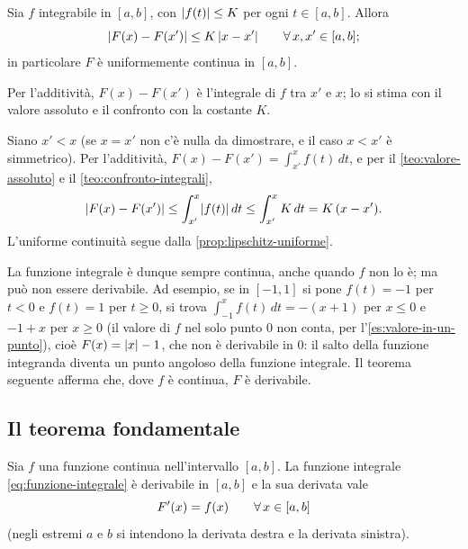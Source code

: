\begin{proposizione}\label{prop:integrale-lipschitz}
Sia $f$ integrabile in $[a,b]$, con $\lvert f(t)\rvert\le K$ per ogni $t\in[a,b]$. Allora
\begin{equation}\label{eq:integrale-lipschitz}
  \lvert F(x)-F(x')\rvert\le K\,\lvert x-x'\rvert \qquad\forall\, x,x'\in[a,b] ;
\end{equation}
in particolare $F$ è uniformemente continua in $[a,b]$.
\end{proposizione}

\begin{schema}
\end{schema}

\begin{strategia}
Per l'additività, $F(x)-F(x')$ è l'integrale di $f$ tra $x'$ e $x$; lo si stima con il
valore assoluto e il confronto con la costante $K$.
\end{strategia}

\begin{dimostrazione}
Siano $x'<x$ (se $x=x'$ non c'è nulla da dimostrare, e il caso $x<x'$ è simmetrico).
Per l'additività, $F(x)-F(x')=\int_{x'}^{x}f(t)\,dt$, e per il \cref{teo:valore-assoluto}
e il \cref{teo:confronto-integrali},
\[
  \lvert F(x)-F(x')\rvert\le\int_{x'}^{x}\lvert f(t)\rvert\,dt\le\int_{x'}^{x}K\,dt=K\,(x-x') .
\]
L'uniforme continuità segue dalla \cref{prop:lipschitz-uniforme}.
\end{dimostrazione}

La funzione integrale è dunque sempre continua, anche quando $f$ non lo è; ma può non
essere derivabile. Ad esempio, se in $[-1,1]$ si pone $f(t)=-1$ per $t<0$ e $f(t)=1$ per
$t\ge0$, si trova $\int_{-1}^{x}f(t)\,dt=-(x+1)$ per $x\le0$ e $-1+x$ per $x\ge0$ (il
valore di $f$ nel solo punto $0$ non conta, per l'\cref{es:valore-in-un-punto}),
cioè $F(x)=\lvert x\rvert-1$, che non è derivabile in $0$: il salto della funzione integranda
diventa un punto angoloso della funzione integrale. Il teorema seguente afferma che,
dove $f$ è continua, $F$ è derivabile.

\subsection{Il teorema fondamentale}

\begin{teorema}\label{teo:fondamentale}
Sia $f$ una funzione continua nell'intervallo $[a,b]$. La funzione integrale
\eqref{eq:funzione-integrale} è derivabile in $[a,b]$ e la sua derivata vale
\begin{equation}\label{eq:teorema-fondamentale}
  F'(x)=f(x) \qquad\forall\, x\in[a,b]
\end{equation}
(negli estremi $a$ e $b$ si intendono la derivata destra e la derivata sinistra).
\end{teorema}

